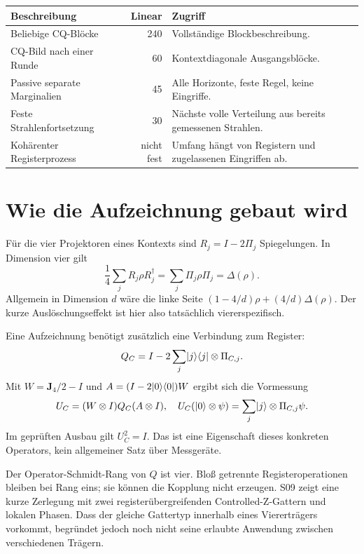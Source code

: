 \par\noindent\begin{tabularx}{\linewidth}{L{56mm}rY}
\toprule
\textbf{Beschreibung}&\textbf{Linear}&\textbf{Zugriff}\\\midrule
Beliebige CQ-Blöcke&240&Vollständige Blockbeschreibung.\\
CQ-Bild nach einer Runde&60&Kontextdiagonale Ausgangsblöcke.\\
Passive separate Marginalien&45&Alle Horizonte, feste Regel, keine Eingriffe.\\
Feste Strahlenfortsetzung&30&Nächste volle Verteilung aus bereits gemessenen Strahlen.\\
Kohärenter Registerprozess&nicht fest&Umfang hängt von Registern und zugelassenen Eingriffen ab.\\\bottomrule
\end{tabularx}\par

\section{Wie die Aufzeichnung gebaut wird}
Für die vier Projektoren eines Kontexts sind $R_j=I-2\Pi_j$ Spiegelungen. In Dimension vier gilt
\begin{equation}
\frac14\sum_jR_j\rho R_j^\dagger=\sum_j\Pi_j\rho\Pi_j=\Delta(\rho).
\end{equation}
Allgemein in Dimension $d$ wäre die linke Seite $(1-4/d)\rho+(4/d)\Delta(\rho)$. Der kurze Auslöschungseffekt ist hier also tatsächlich viererspezifisch.

Eine Aufzeichnung benötigt zusätzlich eine Verbindung zum Register:
\begin{equation}
Q_C=I-2\sum_j\lvert j\rangle\langle j\rvert\otimes\Pi_{C,j}.
\end{equation}
Mit $W=\mathbf J_4/2-I$ und $A=(I-2\lvert0\rangle\langle0\rvert)W$ ergibt sich die Vormessung
\begin{equation}
U_C=(W\otimes I)Q_C(A\otimes I),\quad
U_C(\lvert0\rangle\otimes\psi)=\sum_j\lvert j\rangle\otimes\Pi_{C,j}\psi.
\label{eq:record}
\end{equation}
Im geprüften Ausbau gilt $U_C^2=I$. Das ist eine Eigenschaft dieses konkreten Operators, kein allgemeiner Satz über Messgeräte.

Der Operator-Schmidt-Rang von $Q$ ist vier. Bloß getrennte Registeroperationen bleiben bei Rang eins; sie können die Kopplung nicht erzeugen. S09 zeigt eine kurze Zerlegung mit zwei registerübergreifenden Controlled-Z-Gattern und lokalen Phasen. Dass der gleiche Gattertyp innerhalb eines Viererträgers vorkommt, begründet jedoch noch nicht seine erlaubte Anwendung zwischen verschiedenen Trägern.

